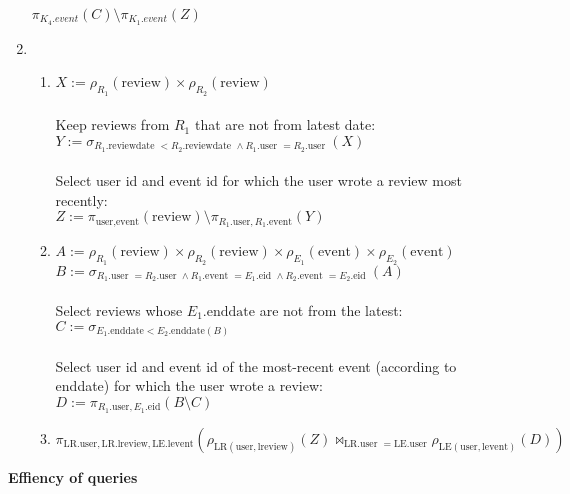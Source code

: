 \documentclass{article}
\newcommand{\GETS}{:=}
\newcommand{\rename}{\rho}
\newcommand{\select}{\sigma}
\newcommand{\rel}[1]{\text{#1}}
\newcommand{\attr}[1]{\text{#1}}
\newcommand{\ra}[2]{\rel{#1}.\attr{#2}}
\newcommand{\project}{\pi}
\newcommand{\product}{\times}
\newcommand{\difference}{\setminus}
\newcommand{\njoin}{\Join}
\begin{document}
\begin{enumerate}
        $\project_{K_4.event}(C) \difference \project_{K_1.event}(Z)$ \\
  \item
    \begin{enumerate}
      \item $X \GETS \rename_{R_1}(\rel{review}) \product
                      \rename_{R_2}(\rel{review})$ \\ \\
            Keep reviews from $R_1$ that are not from latest date: \\
            $Y \GETS \select_{R_1.\attr{reviewdate } < R_2.\attr{reviewdate }
                              \land R_1.\attr{user } = R_2.\attr{user }}(X)$ \\ \\
            Select user id and event id for which the user wrote a review most
            recently: \\
            $Z \GETS
              \project_{\attr{user}, \attr{event}}(\rel{review}) \difference
              \project_{R_1.\attr{user}, R_1.\attr{event}}(Y)$ \\
      \item $A \GETS \rename_{R_1}(\rel{review}) \product
                      \rename_{R_2}(\rel{review}) \product
                      \rename_{E_1}(\rel{event}) \product
                      \rename_{E_2}(\rel{event})$ \\
            $B \GETS \select_{R_1.\attr{user } = R_2.\attr{user } \land
                              R_1.\attr{event } = E_1.\attr{eid } \land
                              R_2.\attr{event } = E_2.\attr{eid }}(A)$ \\ \\
            Select reviews whose $E_1.\attr{enddate}$ are not from the latest: \\
            $C \GETS \select_{E_1.\attr{enddate} < E_2.\attr{enddate}(B)}$ \\ \\
            Select user id and event id of the most-recent event (according to
            enddate) for which the user wrote a review: \\
            $D \GETS \project_{R_1.\attr{user}, E_1.\attr{eid}}(B \difference C)$ \\
      \item $\project_{\ra{LR}{user}, \ra{LR}{lreview}, \ra{LE}{levent}}
              (\rename_{\rel{LR}(\rel{user}, \rel{lreview})}(Z)
                \njoin_{\ra{LR}{user } = \ra{LE}{user}}
                \rename_{\rel{LE}(\rel{user}, \rel{levent})}(D))$ \\
    \end{enumerate}

\end{enumerate}


\textbf{Effiency of queries}
\end{document}
